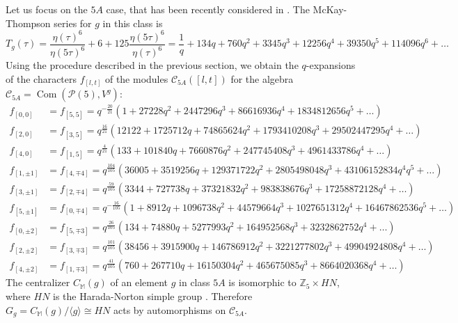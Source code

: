 \documentclass[11pt,reqno]{article}
\newcommand{\be}{\begin{equation}}
\newcommand{\ee}{\end{equation}}
\newcommand{\calC}{\mathcal{C}}
\DeclareMathOperator{\Com}{Com}
\newcommand{\ZZ}{\mathbb{Z}}
\newcommand{\MM}{\mathbb{M}}
\newcommand{\paraf}{\mathcal{P}}
\begin{document}
Let us focus on the $5A$ case, that has been recently considered in \cite{Bae:2020pvv,Honda:2026bjy}. The McKay-Thompson series for $g$ in this class is \cite{ConwayNorton1979}
\be T_g(\tau)=\frac{\eta(\tau)^6}{\eta(5\tau)^6}+6+125\frac{\eta(5\tau)^6}{\eta(\tau)^6}=\frac{1}{q}+134 q+760 q^2+3345 q^3+12256 q^4+39350 q^5+114096 q^6
+\ldots
\ee Using the procedure described in the previous section, we obtain the $q$-expansions of the characters $f_{[l,t]}$ of the modules $\calC_{5A}([l,t])$ for the algebra $\calC_{5A}=\Com(\paraf(5),V^g)$:
\begin{align*}
f_{[0,0]}&=f_{[5,5]}=q^{-\frac{20}{21}}\left(1+27228 q^2+2447296 q^3+86616936 q^4+1834812656 q^5%
+\ldots\right)\\
f_{[2,0]}&=f_{[3,5]}=q^{\frac{16}{21}}\left(12122+1725712 q+74865624 q^2+1793410208 q^3+29502447295 q^4
+\ldots\right)\\
f_{[4,0]}&=f_{[1,5]}=q^{\frac{4}{21}}\left(133+101840 q+7660876 q^2+247745408 q^3+4961433786 q^4%
+\ldots\right)\\
f_{[1,\pm 1]}&=f_{[4,\mp 4]}=q^{\frac{104}{105}}\left(36005+3519256 q+129371722 q^2+2805498048 q^3+43106152834 q^4%
q^5
+\ldots\right)\\
f_{[3,\pm 1]}&=f_{[2,\mp 4]}=q^{\frac{59}{105}}\left(3344+727738 q+37321832 q^2+983838676 q^3+17258872128 q^4
+\ldots\right)\\
f_{[5,\pm 1]}&=f_{[0,\mp 4]}=q^{-\frac{16}{105}}\left(1+8912 q+1096738 q^2+44579664 q^3+1027651312 q^4+16467862536 q^5
+\ldots\right)\\
f_{[0,\pm 2]}&=f_{[5,\mp 3]}=q^{\frac{26}{105}}\left(134+74880 q+5277993 q^2+164952568 q^3+3232862752 q^4%
+\ldots\right)\\
f_{[2,\pm 2]}&=f_{[3,\mp 3]}=q^{\frac{101}{105}}\left(38456+3915900 q+146786912 q^2+3221277802 q^3+49904924808 q^4%
+\ldots\right)\\
f_{[4,\pm 2]}&=f_{[1,\mp 3]}=q^{\frac{41}{105}}\left(760+267710 q+16150304 q^2+465675085 q^3+8664020368 q^4%
+\ldots\right)
\end{align*}
The centralizer $C_\MM(g)$ of an element $g$ in class $5A$ is isomorphic to $\ZZ_5\times HN$, where $HN$ is the Harada-Norton simple group \cite{Atlas}. Therefore $G_g=C_\MM(g)/\langle g\rangle\cong HN$ acts by automorphisms on $\calC_{5A}$.
\end{document}
